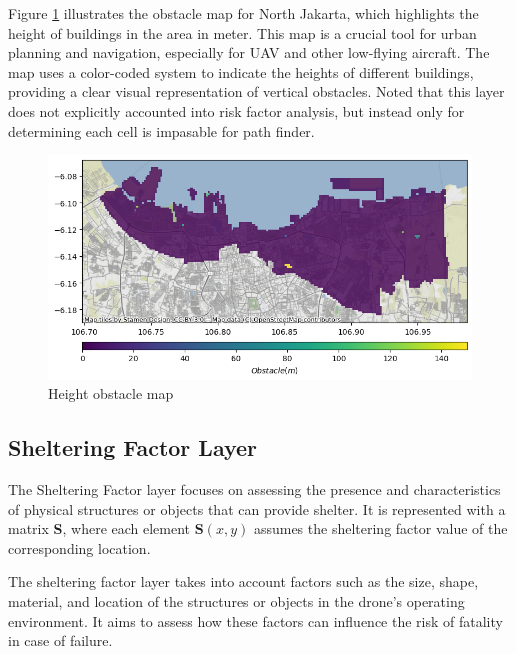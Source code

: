 \documentclass[12pt]{report}
\begin{document}
            Figure \ref{fig:obstacle} illustrates the obstacle map for North Jakarta, which highlights the height of
            buildings in the area in meter. This map is a crucial tool for urban planning and navigation, especially for
            UAV and other low-flying aircraft. The map uses a color-coded system to indicate the heights of different
            buildings, providing a clear visual representation of vertical obstacles. Noted that this layer does not
            explicitly accounted into risk factor analysis, but instead only for determining each cell is impasable for
            path finder.

            \begin{figure}[H]
                \centering
                \includegraphics[width=\textwidth]{Plot/obstacle.png}
                \caption{Height obstacle map}
                \label{fig:obstacle}
            \end{figure}

            \subsection{Sheltering Factor Layer}
                The Sheltering Factor layer focuses on assessing the presence and characteristics of physical structures
                or objects that can provide shelter. It is represented with a matrix \textbf{S}, where each element
                \(\mathbf{S}(x, y)\) assumes the sheltering factor value of the corresponding location.
                        
                The sheltering factor layer takes into account factors such as the size, shape, material, and location
                of the structures or objects in the drone's operating environment. It aims to assess how these factors
                can influence the risk of fatality in case of failure.
                        
\end{document}
